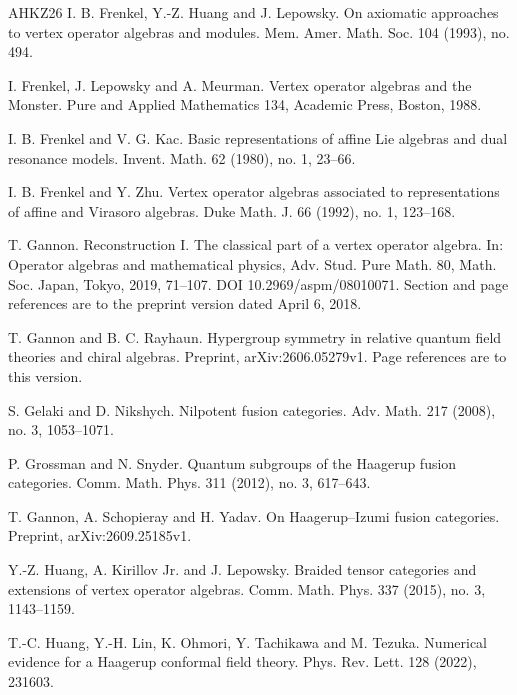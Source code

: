 \documentclass[leqno]{article}
\numberwithin{equation}{section}
\begin{document}
\begin{thebibliography}{AHKZ26}
I. B. Frenkel, Y.-Z. Huang and J. Lepowsky.
\newblock On axiomatic approaches to vertex operator algebras and modules.
\newblock Mem. Amer. Math. Soc. 104 (1993), no. 494.

I. Frenkel, J. Lepowsky and A. Meurman.
\newblock Vertex operator algebras and the Monster.
\newblock Pure and Applied Mathematics 134, Academic Press, Boston, 1988.

I. B. Frenkel and V. G. Kac.
\newblock Basic representations of affine Lie algebras and dual resonance models.
\newblock Invent. Math. 62 (1980), no. 1, 23--66.

I. B. Frenkel and Y. Zhu.
\newblock Vertex operator algebras associated to representations of affine and Virasoro algebras.
\newblock Duke Math. J. 66 (1992), no. 1, 123--168.

T. Gannon.
\newblock Reconstruction I. The classical part of a vertex operator algebra.
\newblock In: Operator algebras and mathematical physics, Adv. Stud. Pure Math. 80, Math. Soc. Japan, Tokyo, 2019, 71--107. DOI 10.2969/aspm/08010071. Section and page references are to the preprint version dated April 6, 2018.

T. Gannon and B. C. Rayhaun.
\newblock Hypergroup symmetry in relative quantum field theories and chiral algebras.
\newblock Preprint, arXiv:2606.05279v1. Page references are to this version.

S. Gelaki and D. Nikshych.
\newblock Nilpotent fusion categories.
\newblock Adv. Math. 217 (2008), no. 3, 1053--1071.

P. Grossman and N. Snyder.
\newblock Quantum subgroups of the Haagerup fusion categories.
\newblock Comm. Math. Phys. 311 (2012), no. 3, 617--643.

T. Gannon, A. Schopieray and H. Yadav.
\newblock On Haagerup--Izumi fusion categories.
\newblock Preprint, arXiv:2609.25185v1.

Y.-Z. Huang, A. Kirillov Jr. and J. Lepowsky.
\newblock Braided tensor categories and extensions of vertex operator algebras.
\newblock Comm. Math. Phys. 337 (2015), no. 3, 1143--1159.

T.-C. Huang, Y.-H. Lin, K. Ohmori, Y. Tachikawa and M. Tezuka.
\newblock Numerical evidence for a Haagerup conformal field theory.
\newblock Phys. Rev. Lett. 128 (2022), 231603.


\end{thebibliography}
\end{document}
